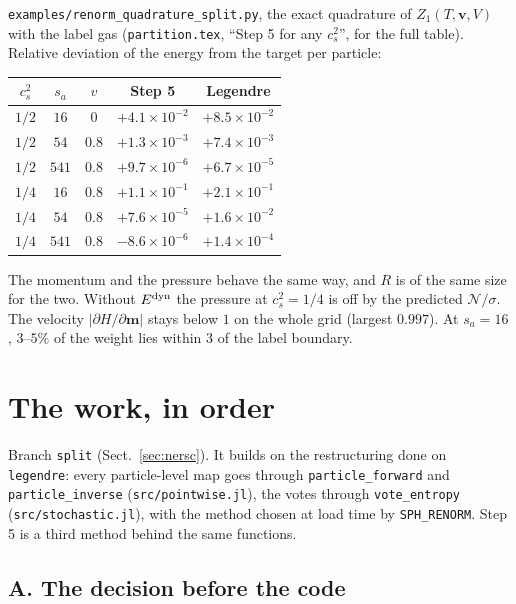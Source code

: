 \documentclass[11pt,aps,preprint,nofootinbib,superscriptaddress,tightenlines]{revtex4-2}
\def\Sect#1{Sect.~\ref{#1}}
\begin{document}
\nolinkurl{examples/renorm_quadrature_split.py}, the exact quadrature of $Z_1(T,\bm v,V)$ with the label gas (\nolinkurl{partition.tex}, ``Step 5 for any $c_s^2$'',
for the full table).  Relative deviation of the energy from the target per particle:
\begin{center}
\small
\begin{tabular}{ccc cc}
\toprule
$c_s^2$ & $s_a$ & $v$ & Step 5 & Legendre \\
\midrule
$1/2$ & $16$ & $0$ & $+4.1\times10^{-2}$ & $+8.5\times10^{-2}$ \\
$1/2$ & $54$ & $0.8$ & $+1.3\times10^{-3}$ & $+7.4\times10^{-3}$ \\
$1/2$ & $541$ & $0.8$ & $+9.7\times10^{-6}$ & $+6.7\times10^{-5}$ \\
$1/4$ & $16$ & $0.8$ & $+1.1\times10^{-1}$ & $+2.1\times10^{-1}$ \\
$1/4$ & $54$ & $0.8$ & $+7.6\times10^{-5}$ & $+1.6\times10^{-2}$ \\
$1/4$ & $541$ & $0.8$ & $-8.6\times10^{-6}$ & $+1.4\times10^{-4}$ \\
\bottomrule
\end{tabular}
\end{center}
The momentum and the pressure behave the same way, and $R$ is of the same size for the two.  Without $E^{\rm dyn}$ the pressure at $c_s^2=1/4$ is off by the predicted
$\mathcal N/\sigma$.  The velocity $|\partial H/\partial\bm m|$ stays below $1$ on the whole grid (largest $0.997$).  At $s_a=16$, $3$--$5\%$ of the weight lies within
$3$ of the label boundary.

\section{The work, in order}
\label{sec:work}

Branch \texttt{split} (\Sect{sec:nersc}).  It builds on the restructuring done on \texttt{legendre}: every particle-level map goes through
\texttt{particle\_forward} and \texttt{particle\_inverse} (\nolinkurl{src/pointwise.jl}), the votes through \texttt{vote\_entropy}
(\nolinkurl{src/stochastic.jl}), with the method chosen at load time by \texttt{SPH\_RENORM}.  Step 5 is a third method behind the same functions.

\subsection{A. The decision before the code}
\end{document}
